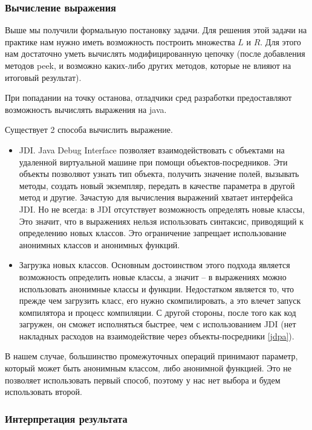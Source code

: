 \subsubsection{Вычисление выражения} \label{code-evaluation}
Выше мы получили формальную постановку задачи. Для решения этой задачи на практике нам нужно иметь возможность построить множества $L$ и $R$. Для этого нам достаточно уметь вычислять модифицированную цепочку (после добавления методов peek, и возможно каких-либо других методов, которые не влияют на итоговый результат).

При попадании на точку останова, отладчики сред разработки предоставляют возможность вычислять выражения на java.

Существует 2 способа вычислить выражение. 
\begin{itemize}
	\item JDI. Java Debug Interface позволяет взаимодействовать с объектами на удаленной виртуальной машине при помощи объектов-посредников. Эти объекты позволяют узнать тип объекта, получить значение полей, вызывать методы, создать новый экземпляр, передать в качестве параметра в другой метод и другие. Зачастую для вычисления выражений хватает интерфейса JDI. Но не всегда: в JDI отсутствует возможность определять новые классы, Это значит, что в выражениях нельзя использовать синтаксис, приводящий к определению новых классов. Это ограничение запрещает использование анонимных классов и анонимных функций.
	\item Загрузка новых классов. Основным достоинством этого подхода является возможность определить новые классы, а значит -- в выражениях можно использовать анонимные классы и функции. Недостатком является то, что прежде чем загрузить класс, его нужно скомпилировать, а это влечет запуск компилятора и процесс компиляции. С другой стороны, после того как код загружен, он сможет исполняться быстрее, чем с использованием JDI (нет накладных расходов на взаимодействие через объекты-посредники \ref{jdpa}).
\end{itemize}

В нашем случае, большинство промежуточных операций принимают параметр, который может быть анонимным классом, либо анонимной функцией. Это не позволяет использовать первый способ, поэтому у нас нет выбора и будем использовать второй.

\subsubsection{Интерпретация результата}\label{interpret}

